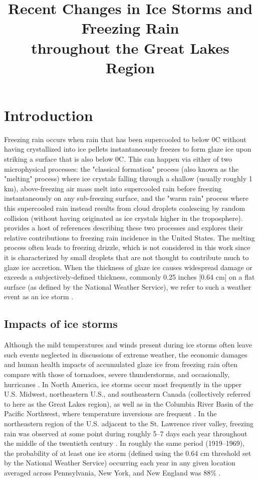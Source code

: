 \documentclass[twocol]{ametsoc}
\title{Recent Changes in Ice Storms and Freezing Rain\\ throughout the Great Lakes Region}
\affiliation{ National Renewable Energy Laboratory, Golden, Colorado}
\begin{document}
\maketitle
%
\section{Introduction}
Freezing rain occurs when rain that has been supercooled to below 0\degree C without having crystallized into ice pellets instantaneously freezes to form glaze ice upon striking a surface that is also below 0\degree C. This can happen via either of two microphysical processes: the "classical formation" process (also known as the "melting" process) where ice crystals falling through a shallow (usually roughly 1 km), above-freezing air mass melt into supercooled rain before freezing instantaneously on any sub-freezing surface, and the "warm rain" process where this supercooled rain instead results from cloud droplets coalescing by random collision (without having originated as ice crystals higher in the troposphere). \citet{rauber2000relative} provides a host of references describing these two processes and explores their relative contributions to freezing rain incidence in the United States. The melting process often leads to freezing drizzle, which is not considered in this work since it is characterized by small droplets that are not thought to contribute much to glaze ice accretion. When the thickness of glaze ice causes widespread damage or exceeds a subjectively-defined thickness, commonly 0.25 inches [0.64 cm] on a flat surface (as defined by the National Weather Service), we refer to such a weather event as an ice storm \citep{nwsglossary}.

\subsection{Impacts of ice storms}
Although the mild temperatures and winds present during ice storms often leave such events neglected in discussions of extreme weather, the economic damages and human health impacts of accumulated glaze ice from freezing rain often compare with those of tornadoes, severe thunderstorms, and occasionally, hurricanes \citep{lott2006tracking}. In North America, ice storms occur most frequently in the upper U.S. Midwest, northeastern U.S., and southeastern Canada (collectively referred to here as the Great Lakes region), as well as in the Columbia River Basin of the Pacific Northwest, where temperature inversions are frequent \citep{changnon2003temporal, bernstein2000regional}. In the northeastern region of the U.S. adjacent to the St. Lawrence river valley, freezing rain was observed at some point during roughly 5--7 days each year throughout the middle of the twentieth century \citep{changnon2003temporal}. In roughly the same period (1919--1969), the probability of at least one ice storm (defined using the 0.64 cm threshold set by the National Weather Service) occurring each year in any given location averaged across Pennsylvania, New York, and New England was 88\% \citep{tattelman1973estimated}. 
\end{document}

